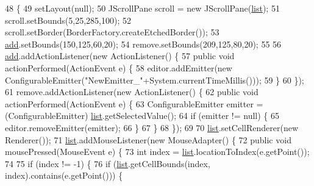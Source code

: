\begin{DoxyCode}
48                                                     \{
49         setLayout(null);
50         JScrollPane scroll = \textcolor{keyword}{new} JScrollPane(\mbox{\hyperlink{classorg_1_1newdawn_1_1slick_1_1tools_1_1peditor_1_1_emitter_list_a201acbbfa375f50045f4f87452a9c722}{list}});
51         scroll.setBounds(5,25,285,100);
52         scroll.setBorder(BorderFactory.createEtchedBorder());
53         \mbox{\hyperlink{classorg_1_1newdawn_1_1slick_1_1tools_1_1peditor_1_1_emitter_list_a8917d12ded4e0e597c9ef64fa7812aee}{add}}.setBounds(150,125,60,20);
54         \textcolor{keyword}{remove}.setBounds(209,125,80,20);
55             
56         \mbox{\hyperlink{classorg_1_1newdawn_1_1slick_1_1tools_1_1peditor_1_1_emitter_list_a8917d12ded4e0e597c9ef64fa7812aee}{add}}.addActionListener(\textcolor{keyword}{new} ActionListener() \{
57             \textcolor{keyword}{public} \textcolor{keywordtype}{void} actionPerformed(ActionEvent e) \{
58                 editor.addEmitter(\textcolor{keyword}{new} ConfigurableEmitter(\textcolor{stringliteral}{"NewEmitter\_"}+System.currentTimeMillis()));
59             \}
60         \});
61         \textcolor{keyword}{remove}.addActionListener(\textcolor{keyword}{new} ActionListener() \{
62             \textcolor{keyword}{public} \textcolor{keywordtype}{void} actionPerformed(ActionEvent e) \{
63                 ConfigurableEmitter emitter = (ConfigurableEmitter) \mbox{\hyperlink{classorg_1_1newdawn_1_1slick_1_1tools_1_1peditor_1_1_emitter_list_a201acbbfa375f50045f4f87452a9c722}{list}}.getSelectedValue();
64                 \textcolor{keywordflow}{if} (emitter != null) \{
65                     editor.removeEmitter(emitter);
66                 \}
67             \}
68         \});
69         
70         \mbox{\hyperlink{classorg_1_1newdawn_1_1slick_1_1tools_1_1peditor_1_1_emitter_list_a201acbbfa375f50045f4f87452a9c722}{list}}.setCellRenderer(\textcolor{keyword}{new} Renderer());
71         \mbox{\hyperlink{classorg_1_1newdawn_1_1slick_1_1tools_1_1peditor_1_1_emitter_list_a201acbbfa375f50045f4f87452a9c722}{list}}.addMouseListener(\textcolor{keyword}{new} MouseAdapter() \{
72             \textcolor{keyword}{public} \textcolor{keywordtype}{void} mousePressed(MouseEvent e) \{
73                 \textcolor{keywordtype}{int} index = \mbox{\hyperlink{classorg_1_1newdawn_1_1slick_1_1tools_1_1peditor_1_1_emitter_list_a201acbbfa375f50045f4f87452a9c722}{list}}.locationToIndex(e.getPoint());
74 
75                 \textcolor{keywordflow}{if} (index != -1) \{
76                     \textcolor{keywordflow}{if} (\mbox{\hyperlink{classorg_1_1newdawn_1_1slick_1_1tools_1_1peditor_1_1_emitter_list_a201acbbfa375f50045f4f87452a9c722}{list}}.getCellBounds(index, index).contains(e.getPoint())) \{

\end{DoxyCode}
